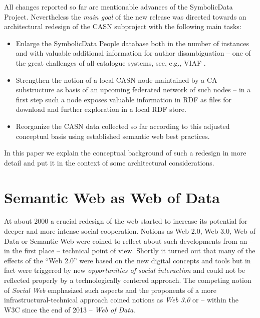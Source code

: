 \documentclass{llncs}
\newcommand{\SD}{{\sc Symbo\-lic\-Data}}
\begin{document}
All changes reported so far are mentionable advances of the {\SD} Project.
Nevertheless the \emph{main goal} of the new release was directed towards an
architectural redesign of the CASN subproject with the following main tasks:
\begin{itemize}
\item Enlarge the {\SD} People database both in the number of instances and
  with valuable additional information for author disambiguation -- one of the
  great challenges of all catalogue systems, see, e.g., VIAF \cite{viaf}.
\item Strengthen the notion of a local CASN node maintained by a CA
  substructure as basis of an upcoming federated network of such nodes -- in a
  first step such a node exposes valuable information in RDF as files for
  download and further exploration in a local RDF store.
\item Reorganize the CASN data collected so far according to this adjusted
  conceptual basis using established semantic web best practices.
\end{itemize}
In this paper we explain the conceptual background of such a redesign in more
detail and put it in the context of some architectural considerations.

\section{Semantic Web as Web of Data}

At about 2000 a crucial redesign of the web started to increase its potential
for deeper and more intense social cooperation. Notions as Web 2.0, Web 3.0,
Web of Data or Semantic Web were coined to reflect about such developments from
an -- in the first place -- technical point of view.  Shortly it turned out
that many of the effects of the ``Web 2.0'' were based on the new digital
concepts and tools but in fact were triggered by new \emph{opportunities of
  social interaction} and could not be reflected properly by a technologically
centered approach. The competing notion of \emph{Social Web} emphasized such
aspects and the proponents of a more infrastructural-technical approach coined
notions as \emph{Web 3.0} or -- within the W3C since the end of 2013 --
\emph{Web of Data}.
\end{document}
